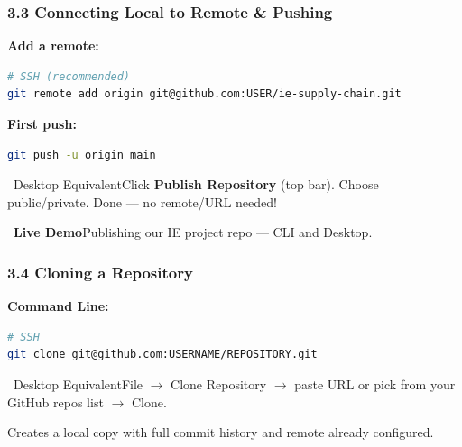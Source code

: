 \documentclass{beamer}
\newcommand{\livedemo}[1]{\begin{alertblock}{\faDesktop\ \textbf{Live Demo}}#1\end{alertblock}}
\newcommand{\desktoptip}[1]{\begin{block}{\faMousePointer\ Desktop Equivalent}#1\end{block}}
\begin{document}
\begin{frame}[fragile]
\frametitle{3.3 Connecting Local to Remote \& Pushing}

\textbf{Add a remote:}
\begin{lstlisting}[language=bash]
# SSH (recommended)
git remote add origin git@github.com:USER/ie-supply-chain.git

\end{lstlisting}

\textbf{First push:}
\begin{lstlisting}[language=bash]
git push -u origin main
\end{lstlisting}

\desktoptip{Click \textbf{Publish Repository} (top bar). Choose public/private. Done --- no remote/URL needed!}

\livedemo{Publishing our IE project repo --- CLI and Desktop.}
\end{frame}

\begin{frame}[fragile]
\frametitle{3.4 Cloning a Repository}

\textbf{Command Line:}
\begin{lstlisting}[language=bash]
# SSH
git clone git@github.com:USERNAME/REPOSITORY.git

\end{lstlisting}

\desktoptip{File $\rightarrow$ Clone Repository $\rightarrow$ paste URL or pick from your GitHub repos list $\rightarrow$ Clone.}

Creates a local copy with full commit history and remote already configured.
\end{frame}
\end{document}
